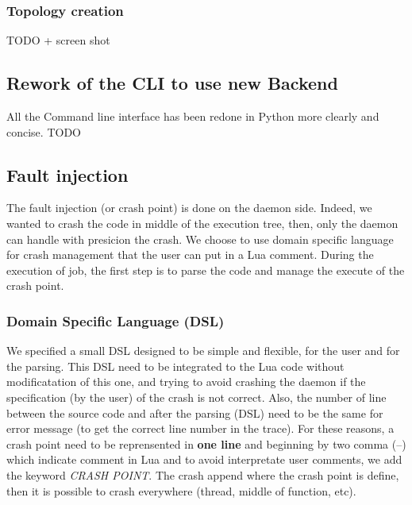 \documentclass{eplmastersthesis}
\begin{document}
        \subsubsection{Topology creation}
        {\color{red} TODO + screen shot}

      \subsection{Rework of the CLI to use new Backend}

        All the Command line interface has been redone in Python more clearly and concise. {\color{red} TODO }

      \subsection{Fault injection}
        The fault injection (or crash point) is done on the daemon side. Indeed, we wanted
        to crash the code in middle of the execution tree, then, only the daemon can
        handle with presicion the crash. We choose to use domain specific language for
        crash management that the user can put in a Lua comment. During the execution of job, the first step
        is to parse the code and manage the execute of the crash point.

        \subsubsection{Domain Specific Language (DSL)}

        We specified a small DSL designed to be simple and flexible, for the user and for the parsing. This DSL need to
        be integrated to the Lua code without modificatation of this one, and trying to avoid crashing the
        daemon if the specification (by the user) of the crash is not correct. Also, the number of line between the
        source code and after the parsing (DSL) need to be the same for error message (to get the correct line number in the trace).
        For these reasons, a crash point need to be reprensented in \textbf{one line} and beginning by two comma (--) which
        indicate comment in Lua and to avoid interpretate user comments, we add the keyword \textit{CRASH POINT}.
        The crash append where the crash point is define, then it is possible to
        crash everywhere (thread, middle of function, etc). \\
\end{document}
